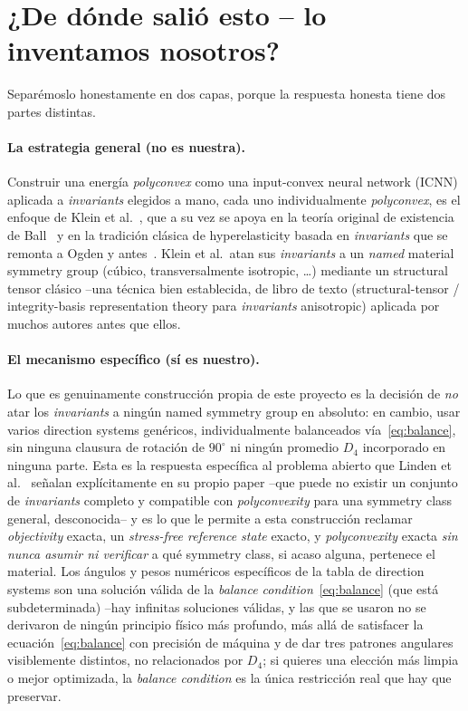 \documentclass[11pt,a4paper]{article}
\begin{document}
\section{¿De d\'onde sali\'o esto -- lo inventamos nosotros?}
\label{sec:provenance}

Separ\'emoslo honestamente en dos capas, porque la respuesta honesta
tiene dos partes distintas.

\paragraph{La estrategia general (no es nuestra).} Construir una
energ\'ia \emph{polyconvex} como una input-convex neural network (ICNN)
aplicada a \emph{invariants} elegidos a mano, cada uno individualmente
\emph{polyconvex}, es el enfoque de Klein et
al.~\cite{Klein2022}, que a su vez se apoya en la teor\'ia original de
existencia de Ball~\cite{Ball1977} y en la tradici\'on cl\'asica de
hyperelasticity basada en \emph{invariants} que se remonta a Ogden y
antes~\cite{Ogden1984}. Klein et al.\ atan sus \emph{invariants} a un
\emph{named} material symmetry group (c\'ubico, transversalmente
isotropic, \dots) mediante un structural tensor cl\'asico --una t\'ecnica
bien establecida, de libro de texto (structural-tensor / integrity-basis
representation theory para \emph{invariants} anisotropic) aplicada por
muchos autores antes que ellos.

\paragraph{El mecanismo espec\'ifico (s\'i es nuestro).} Lo que es
genuinamente construcci\'on propia de este proyecto es la decisi\'on de
\emph{no} atar los \emph{invariants} a ning\'un named symmetry group en
absoluto: en cambio, usar varios direction systems gen\'ericos,
individualmente balanceados v\'ia~\eqref{eq:balance}, sin ninguna
clausura de rotaci\'on de $90^\circ$ ni ning\'un promedio $D_4$
incorporado en ninguna parte. Esta es la respuesta espec\'ifica al
problema abierto que Linden et al.~\cite{Linden2023} se\~nalan
expl\'icitamente en su propio paper --que puede no existir un conjunto
de \emph{invariants} completo y compatible con \emph{polyconvexity} para
una symmetry class general, desconocida-- y es lo que le permite a esta
construcci\'on reclamar \emph{objectivity} exacta, un \emph{stress-free
reference state} exacto, y \emph{polyconvexity} exacta \emph{sin nunca
asumir ni verificar} a qu\'e symmetry class, si acaso alguna, pertenece
el material. Los \'angulos y pesos num\'ericos espec\'ificos de la
tabla de direction systems son una soluci\'on v\'alida de la
\emph{balance condition}~\eqref{eq:balance} (que est\'a subdeterminada)
--hay infinitas soluciones v\'alidas, y las que se usaron no se derivaron
de ning\'un principio f\'isico m\'as profundo, m\'as all\'a de satisfacer
la ecuaci\'on~\eqref{eq:balance} con precisi\'on de m\'aquina y de dar
tres patrones angulares visiblemente distintos, no relacionados por
$D_4$; si quieres una elecci\'on m\'as limpia o mejor optimizada, la
\emph{balance condition} es la \'unica restricci\'on real que hay que
preservar.
\end{document}
